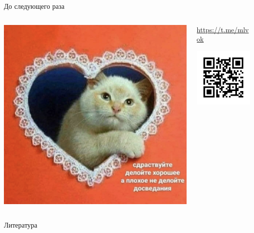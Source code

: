 \documentclass[11pt,aspectratio=169,handout]{beamer}
\begin{document}
\begin{frame}{До следующего раза}

\begin{columns}
\begin{column}{0.45\textwidth}
   \begin{center}
                \includegraphics[scale=0.25]{images/bye.png}
   \end{center}
\end{column}
\begin{column}{0.45\textwidth}
   \begin{center}
                \url{https://t.me/mlvok}

                \includegraphics[scale=0.5]{images/tgqr.png}
   \end{center}
\end{column}
\end{columns}

\end{frame}

\begin{frame}[allowframebreaks]{Литература}




\end{frame}
\end{document}
